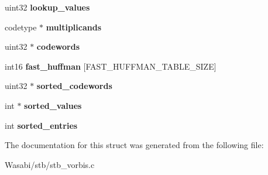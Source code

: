 \begin{DoxyCompactItemize}
\item 
uint32 {\bfseries lookup\+\_\+values}\hypertarget{struct_codebook_abf078c998edfa8432087a5df96810c24}{}\label{struct_codebook_abf078c998edfa8432087a5df96810c24}

\item 
codetype $\ast$ {\bfseries multiplicands}\hypertarget{struct_codebook_a6d20dcddba93d3df6f6c9f3c1fbcf8fd}{}\label{struct_codebook_a6d20dcddba93d3df6f6c9f3c1fbcf8fd}

\item 
uint32 $\ast$ {\bfseries codewords}\hypertarget{struct_codebook_a451075bbaced9845ae13a07f4696360a}{}\label{struct_codebook_a451075bbaced9845ae13a07f4696360a}

\item 
int16 {\bfseries fast\+\_\+huffman} \mbox{[}F\+A\+S\+T\+\_\+\+H\+U\+F\+F\+M\+A\+N\+\_\+\+T\+A\+B\+L\+E\+\_\+\+S\+I\+ZE\mbox{]}\hypertarget{struct_codebook_a5c6cba3f39227170f8f7806d0756b47f}{}\label{struct_codebook_a5c6cba3f39227170f8f7806d0756b47f}

\item 
uint32 $\ast$ {\bfseries sorted\+\_\+codewords}\hypertarget{struct_codebook_a4823cd33a7bc61b11af9ce1c2b6e569d}{}\label{struct_codebook_a4823cd33a7bc61b11af9ce1c2b6e569d}

\item 
int $\ast$ {\bfseries sorted\+\_\+values}\hypertarget{struct_codebook_afd7e12e75d4a9ca547dd19590c888238}{}\label{struct_codebook_afd7e12e75d4a9ca547dd19590c888238}

\item 
int {\bfseries sorted\+\_\+entries}\hypertarget{struct_codebook_a1833700bf5f00815e1f0f8b3ebb77045}{}\label{struct_codebook_a1833700bf5f00815e1f0f8b3ebb77045}

\end{DoxyCompactItemize}


The documentation for this struct was generated from the following file\+:\begin{DoxyCompactItemize}
\item 
Wasabi/stb/stb\+\_\+vorbis.\+c\end{DoxyCompactItemize}
